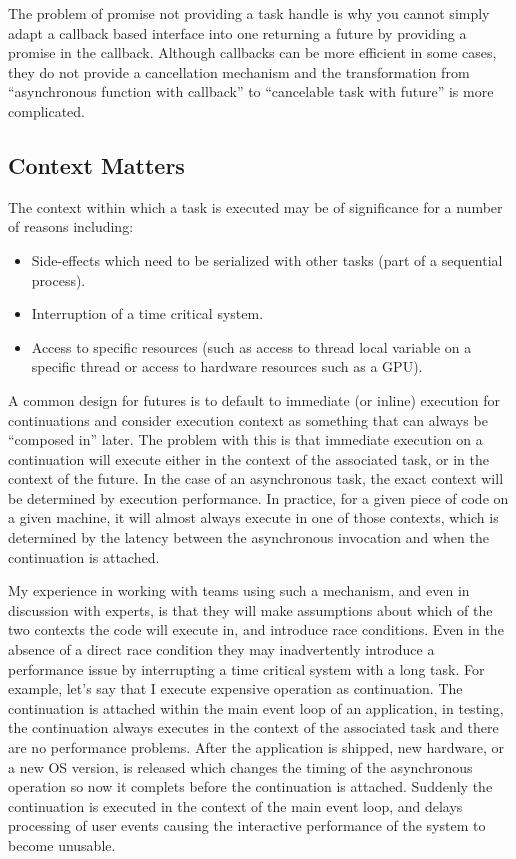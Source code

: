 The problem of promise not providing a task handle is why you cannot simply adapt a callback based interface into one returning a future by providing a promise in the callback. Although callbacks can be more efficient in some cases, they do not provide a cancellation mechanism and the transformation from “asynchronous function with callback” to “cancelable task with future” is more complicated.

\subsection{Context Matters}

The context within which a task is executed may be of significance for a number of reasons including:

\begin{itemize}
\item Side-effects which need to be serialized with other tasks (part of a sequential process).
\item Interruption of a time critical system.
\item Access to specific resources (such as access to thread local variable on a specific thread or access to hardware resources such as a GPU).
\end{itemize}

A common design for futures is to default to immediate (or inline) execution for continuations and consider execution context as something that can always be “composed in” later. The problem with this is that immediate execution on a continuation will execute either in the context of the associated task, or in the context of the future. In the case of an asynchronous task, the exact context will be determined by execution performance. In practice, for a given piece of code on a given machine, it will almost always execute in one of those contexts, which is determined by the latency between the asynchronous invocation and when the continuation is attached.

My experience in working with teams using such a mechanism, and even in discussion with experts, is that they will make assumptions about which of the two contexts the code will execute in, and introduce race conditions. Even in the absence of a direct race condition they may inadvertently introduce a performance issue by interrupting a time critical system with a long task. For example, let’s say that I execute expensive operation as continuation. The continuation is attached within the main event loop of an application, in testing, the continuation always executes in the context of the associated task and there are no performance problems. After the application is shipped, new hardware, or a new OS version, is released which changes the timing of the asynchronous operation so now it complets before the continuation is attached. Suddenly the continuation is executed in the context of the main event loop, and delays processing of user events causing the interactive performance of the system to become unusable.

